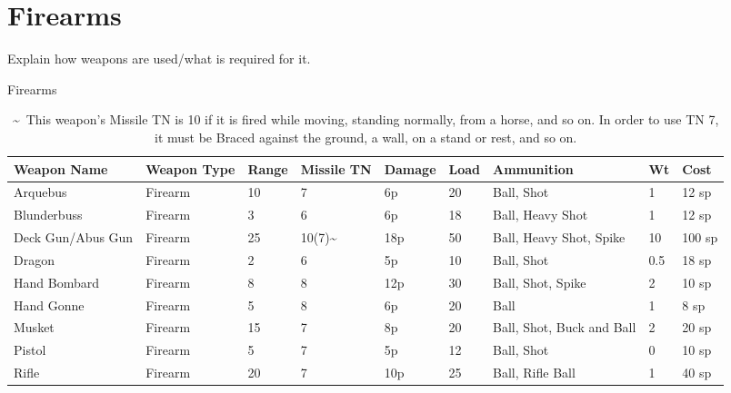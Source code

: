 \documentclass[oneside,11pt,english]{book}
\begin{document}
\section{Firearms}
Explain how weapons are used/what is required for it.
\begin{table}[!hb]
	\caption{Firearms}
	\label{tab:Firearms}
	\begin{tabu} to 
		\rowfont[c]{}Weapon Name & Weapon Type & Range & Missile TN           & Damage & Load & Ammunition                & Wt  & Cost   \\ \toprule
		Arquebus                 & Firearm     & 10    & 7                    & 6p     & 20   & Ball, Shot                & 1   & 12 sp  \\
		Blunderbuss              & Firearm     & 3     & 6                    & 6p     & 18   & Ball, Heavy Shot          & 1   & 12 sp  \\
		Deck Gun/Abus Gun        & Firearm     & 25    & 10(7)\textasciitilde & 18p    & 50   & Ball, Heavy Shot, Spike   & 10  & 100 sp \\
		Dragon                   & Firearm     & 2     & 6                    & 5p     & 10   & Ball, Shot                & 0.5 & 18 sp  \\
		Hand Bombard             & Firearm     & 8     & 8                    & 12p    & 30   & Ball, Shot, Spike         & 2   & 10 sp  \\
		Hand Gonne               & Firearm     & 5     & 8                    & 6p     & 20   & Ball                      & 1   & 8 sp   \\
		Musket                   & Firearm     & 15    & 7                    & 8p     & 20   & Ball, Shot, Buck and Ball & 2   & 20 sp  \\
		Pistol                   & Firearm     & 5     & 7                    & 5p     & 12   & Ball, Shot                & 0   & 10 sp  \\
		Rifle                    & Firearm     & 20    & 7                    & 10p    & 25   & Ball, Rifle Ball          & 1   & 40 sp
	\end{tabu}
\vspace{5pt}\caption*{\textasciitilde~This weapon’s Missile TN is 10 if it is fired while moving, standing normally, from a horse, and so on. In order to use TN 7, it must be Braced against the ground, a wall, on a stand or rest, and so on.}
\end{table}
\end{document}
